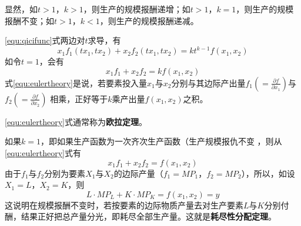 显然，如$t>1$，$k>1$，则生产的规模报酬递增；如$t>1$，$k=1$，则生产的规模报酬不变；如$t>1$，$k<1$，则生产的规模报酬递减。

\eqref{equ:qicifunc}式两边对$t$求导，有
\begin{equation}
x_1 f_1(tx_1 , tx_2) + x_2f_2(tx_1 , tx_2) = kt^{k-1}f(x_1 , x_2)
\end{equation}
如令$t=1$，会有
\begin{equation}
x_1 f_1 + x_2 f_2 = k f(x_1 , x_2)	\label{equ:eulertheory}
\end{equation}
式\eqref{equ:eulertheory}是说，若要素投入量$x_1$与$x_2$分别与其边际产出量$f_1 (=\frac{\partial f}{\partial x_1})$与$f_2 (=\frac{\partial f}{\partial x_2})$ 相乘，正好等于$k$乘产出量$f(x_1 , x_2)$之积。

\eqref{equ:eulertheory}式通常称为\textbf{欧拉定理}。

如果$k=1$，即如果生产函数为一次齐次生产函数（生产规模报仇不变
，则从\eqref{equ:eulertheory}式有
\begin{equation}
x_1 f_1 + x_2 f_2 = f(x_1 , x_2)	\label{equ:eulertheoryA}
\end{equation}
由于$f_1$与$f_2$分别为要素$X_1$与$X_2$的边际产量（$f_1 = MP_1$，$f_2 = MP_2$），所以，如设$X_1 = L$，$X_2 = K$，则
\begin{equation}
L \cdot MP_L + K \cdot MP_K = f(x_1, x_2) = y	\label{equ:eulertheoryB}
\end{equation}
这说明在规模报酬不变时，若按要素的边际物质产量去对生产要素$L$与$K$分别付酬，结果正好把总产量分光，即耗尽全部生产量。这就是\textbf{耗尽性分配定理}。
